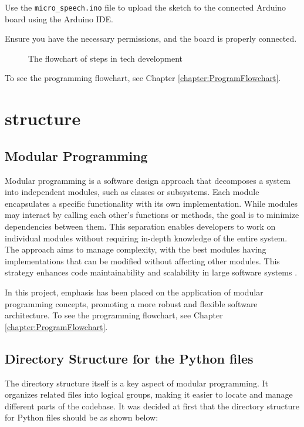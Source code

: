 Use the \texttt{micro\_speech.ino} file to upload the sketch to the connected Arduino board using the Arduino IDE.

Ensure you have the necessary permissions, and the board is properly connected.

\begin{figure}
	\centering
	
	\caption{The flowchart of steps in tech development} \label{fig:techDevFlowchart}
\end{figure}


To see the programming flowchart, see Chapter \ref{chapter:ProgramFlowchart}.


\section{structure}

\subsection{Modular Programming}

Modular programming is a software design approach that decomposes a system into independent modules, such as classes or subsystems. Each module encapsulates a specific functionality with its own implementation. While modules may interact by calling each other's functions or methods, the goal is to minimize dependencies between them. This separation enables developers to work on individual modules without requiring in-depth knowledge of the entire system. The approach aims to manage complexity, with the best modules having implementations that can be modified without affecting other modules. This strategy enhances code maintainability and scalability in large software systems \cite{Ousterhout:2018}.

In this project, emphasis has been placed on the application of modular programming concepts, promoting a more robust and flexible software architecture. To see the programming flowchart, see Chapter \ref{chapter:ProgramFlowchart}.

\subsection{Directory Structure for the Python files}

The directory structure itself is a key aspect of modular programming. It organizes related files into logical groups, making it easier to locate and manage different parts of the codebase. It was decided at first that the directory structure for Python files should be as shown below:

